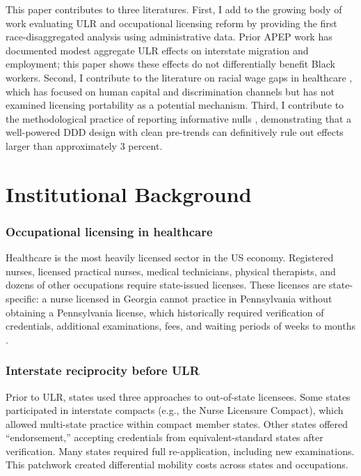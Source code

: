 \documentclass[12pt]{article}
\begin{document}
This paper contributes to three literatures. First, I add to the growing body of work evaluating ULR and occupational licensing reform \citep{kleiner2006licensing, johnson2020licensing, thornton2023mobility} by providing the first race-disaggregated analysis using administrative data. Prior APEP work has documented modest aggregate ULR effects on interstate migration and employment; this paper shows these effects do not differentially benefit Black workers. Second, I contribute to the literature on racial wage gaps in healthcare \citep{spetz2014nurse, buerhaus2017racial}, which has focused on human capital and discrimination channels but has not examined licensing portability as a potential mechanism. Third, I contribute to the methodological practice of reporting informative nulls \citep{abadie2020null}, demonstrating that a well-powered DDD design with clean pre-trends can definitively rule out effects larger than approximately 3 percent.

\section{Institutional Background}

\subsubsection*{Occupational licensing in healthcare} Healthcare is the most heavily licensed sector in the US economy. Registered nurses, licensed practical nurses, medical technicians, physical therapists, and dozens of other occupations require state-issued licenses. These licenses are state-specific: a nurse licensed in Georgia cannot practice in Pennsylvania without obtaining a Pennsylvania license, which historically required verification of credentials, additional examinations, fees, and waiting periods of weeks to months \citep{kleiner2006licensing}.

\subsubsection*{Interstate reciprocity before ULR} Prior to ULR, states used three approaches to out-of-state licensees. Some states participated in interstate compacts (e.g., the Nurse Licensure Compact), which allowed multi-state practice within compact member states. Other states offered ``endorsement,'' accepting credentials from equivalent-standard states after verification. Many states required full re-application, including new examinations. This patchwork created differential mobility costs across states and occupations.
\end{document}
